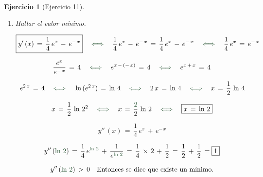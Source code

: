 \documentclass[a4paper,11pt, openany]{book}
\newtheorem{ejer}{Ejercicio}[section]
\newcommand*{\itembolasazules}[1]{%
\footnotesize\protect\tikz[baseline=-3pt]%
\protect\node[scale=.7, circle, shade, ball
color=green]{\color{white}\Large\bf#1};}
\begin{document}
\begin{ejer}[Ejercicio 11]
\begin{enumerate}[label=\itembolasazules{\arabic*}]
$$2\,C_{1}\,=\,\dfrac{1}{2} \quad \textcolor{ao(english)}{\iff} \quad C_{1}\,=\,\dfrac{1}{2\,\textcolor{red}{\times}\,2} \quad \textcolor{ao(english)}{\iff} \quad \boxed{C_{1}\,=\,\dfrac{1}{4}}$$

Sustituyendo $C_{1}$ en la primera ecuación:

$$\textcolor{red}{\dfrac{1}{4}}\,+\,C_{2}\,=\,\dfrac{5}{4} \quad \textcolor{ao(english)}{\iff} \quad C_{2}\,=\,\dfrac{5}{4}\,-\,\textcolor{red}{\dfrac{1}{4}} \quad \textcolor{ao(english)}{\iff} \quad C_{2}\,=\,\dfrac{4}{4} \quad \textcolor{ao(english)}{\iff} \quad \boxed{C_{2}\,=\,1}$$
 
$$\text{Solución particular} \qquad \boxed{y\,(x)\,=\,\dfrac{1}{4}\,e^{x}\,+\,e^{-\,x}}$$

\item Hallar el valor mínimo. 
 
$$\boxed{y'\,(x)\,=\,\dfrac{1}{4}\,e^{x}\,-\,e^{-\,x}} \quad \textcolor{calpolypomonagreen}{\iff} \quad \dfrac{1}{4}\,e^{x}\,-\,e^{-\,x}\,=\, \dfrac{1}{4}\,e^{x}\,-\,e^{-\,x} \quad \textcolor{calpolypomonagreen}{\iff} \quad \dfrac{1}{4}\,e^{x}\,=\,e^{-\,x}$$
 
$$\dfrac{e^{x}}{e^{-\,x}}\,=\,4 \quad \textcolor{calpolypomonagreen}{\iff} \quad e^{x\,-\,(-\,x)}\,=\,4 \quad \textcolor{calpolypomonagreen}{\iff} \quad e^{x\,+\,x}\,=\,4$$
 
$$e^{2\,x}\,=\,4 \quad \textcolor{calpolypomonagreen}{\iff} \quad \ln\,(e^{2\,x})\,=\,\ln\,4 \quad \textcolor{calpolypomonagreen}{\iff} \quad 2\,x\,=\,\ln\,4 \quad \textcolor{calpolypomonagreen}{\iff} \quad x\,=\,\dfrac{1}{2}\,\ln\,4$$
 
$$x\,=\,\dfrac{1}{2}\,\ln\,2^{2} \quad \textcolor{calpolypomonagreen}{\iff} \quad x\,=\,\dfrac{\textcolor{calpolypomonagreen}{2} }{2}\,\ln\,2 \quad \textcolor{calpolypomonagreen}{\iff} \quad \boxed{x\,=\,\ln\,2}$$
 
$$\boxed{y''\,(x)\,=\,\dfrac{1}{4}\,e^{x}\,+\,e^{-\,x}}$$
 
$$y''\,(\textcolor{calpolypomonagreen}{\ln\,2})\,=\,\dfrac{1}{4}\,e^{\textcolor{calpolypomonagreen}{\ln\,2}}\,+\,\dfrac{1}{e^{\textcolor{calpolypomonagreen}{\ln\,2}}}\,=\,\dfrac{1}{4}\,\times\,2\,+\,\dfrac{1}{2}\,=\,\dfrac{1}{2}\,+\,\dfrac{1}{2}\,=\boxed{1}$$
 
$$y''\,(\textcolor{calpolypomonagreen}{\ln\,2})\,>\,0 \quad \text{Entonces se dice que existe un mínimo.}$$

\end{enumerate}
 
\end{ejer}
 
\end{document}
